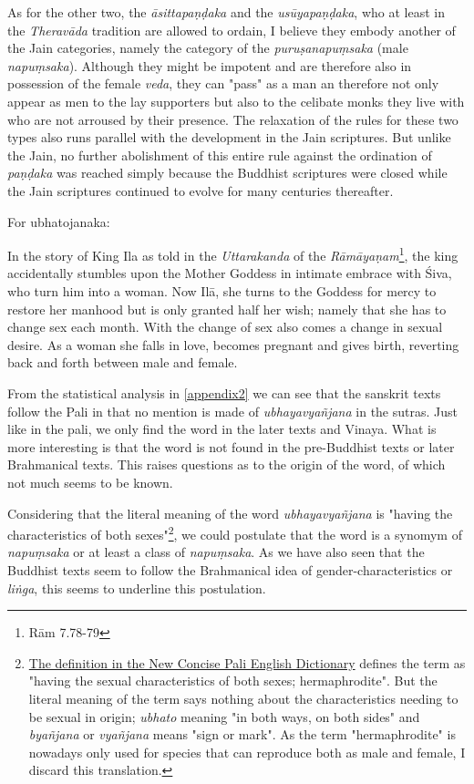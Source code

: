 As for the other two, the {\em āsittapaṇḍaka} and the {\em usūyapaṇḍaka}, who at least in the {\em Theravāda} tradition are allowed to ordain, I believe they embody another of the Jain categories, namely the category of the {\em puruṣanapuṃsaka} (male {\em napuṃsaka}). Although they might be impotent and are therefore also in possession of the female {\em veda}, they can "pass" as a man an therefore not only appear as men to the lay supporters but also to the celibate monks they live with who are not arroused by their presence. The relaxation of the rules for these two types also runs parallel with the development in the Jain scriptures. But unlike the Jain, no further abolishment of this entire rule against the ordination of {\em paṇḍaka} was reached simply because the Buddhist scriptures were closed while the Jain scriptures continued to evolve for many centuries thereafter.







For ubhatojanaka:

\cite{goldman} In the story of King Ila as told in the {\em Uttarakanda} of the {\em Rāmāyaṇam}\footnote{Rām 7.78-79}, the king accidentally stumbles upon the Mother Goddess in intimate embrace with Śiva, who turn him into a woman. Now Ilā, she turns to the Goddess for mercy to restore her manhood but is only granted half her wish; namely that she has to change sex each month. With the change of sex also comes a change in sexual desire. As a woman she falls in love, becomes pregnant and gives birth, reverting back and forth between male and female. 

From the statistical analysis in \ref{appendix2} we can see that the sanskrit texts follow the Pali in that no mention is made of {\em ubhayavyañjana} in the sutras. Just like in the pali, we only find the word in the later texts and Vinaya. What is more interesting is that the word is not found in the pre-Buddhist texts or later Brahmanical texts. This raises questions as to the origin of the word, of which not much seems to be known.

Considering that the literal meaning of the word {\em ubhayavyañjana} is "having the characteristics of both sexes"\footnote{\href{https://suttacentral.net/define/ubhatovya%C3%B1janaka}{The definition in the New Concise Pali English Dictionary} defines the term as "having the sexual characteristics of both sexes; hermaphrodite". But the literal meaning of the term says nothing about the characteristics needing to be sexual in origin; {\em ubhato} meaning "in both ways, on both sides" and {\em byañjana} or {\em vyañjana} means "sign or mark". As the term "hermaphrodite" is nowadays only used for species that can reproduce both as male and female, I discard this translation.}, we could postulate that the word is a synomym of {\em napuṃsaka} or at least a class of {\em napuṃsaka}. As we have also seen that the Buddhist texts seem to follow the Brahmanical idea of gender-characteristics or {\em liṅga}, this seems to underline this postulation.


